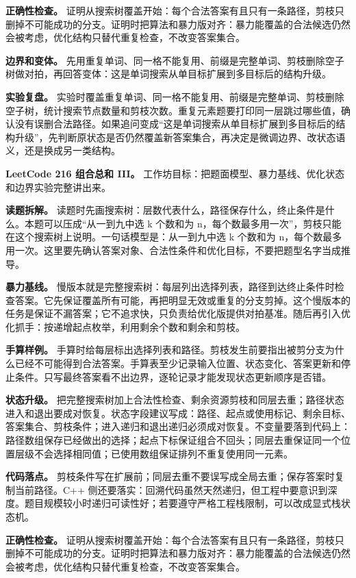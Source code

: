 \textbf{正确性检查。} 证明从搜索树覆盖开始：每个合法答案有且只有一条路径，剪枝只删掉不可能成功的分支。证明时把算法和暴力版对齐：暴力能覆盖的合法候选仍然会被考虑，优化结构只替代重复检查，不改变答案集合。

\textbf{边界和变体。} 先用重复单词、同一格不能复用、前缀是完整单词、剪枝删除空子树做对拍，再回答变体：这是单词搜索从单目标扩展到多目标后的结构升级。

\textbf{实验复盘。} 实验时覆盖重复单词、同一格不能复用、前缀是完整单词、剪枝删除空子树，统计搜索节点数量和剪枝次数。重复元素题要打印同一层跳过哪些值，确认没有误删合法路径。如果追问变成“这是单词搜索从单目标扩展到多目标后的结构升级”，先判断原状态是否仍然覆盖新答案集合，再决定是微调边界、改状态语义，还是换成另一类结构。

\noindent\textbf{LeetCode 216 组合总和 III。} 工作坊目标：把题面模型、暴力基线、优化状态和边界实验完整讲出来。

\textbf{读题拆解。} 读题时先画搜索树：层数代表什么，路径保存什么，终止条件是什么。本题可以压成“从一到九中选 k 个数和为 n，每个数最多用一次”，剪枝只能在这个搜索树上说明。一句话模型是：从一到九中选 k 个数和为 n，每个数最多用一次。这里要先确认答案对象、合法性条件和优化目标，不要把题型名字当成推导。

\textbf{暴力基线。} 慢版本就是完整搜索树：每层列出选择列表，路径到达终止条件时检查答案。它先保证覆盖所有可能，再把明显无效或重复的分支剪掉。这个慢版本的任务是保证不漏答案；它不追求快，只负责给优化版提供对拍基准。随后再引入优化抓手：按递增起点枚举，利用剩余个数和剩余和剪枝。

\textbf{手算样例。} 手算时给每层标出选择列表和路径。剪枝发生前要指出被剪分支为什么已经不可能得到合法答案。手算表至少记录输入位置、状态变化、答案更新和停止条件。只写最终答案看不出边界，逐轮记录才能发现状态更新顺序是否错。

\textbf{状态升级。} 把完整搜索树加上合法性检查、剩余资源剪枝和同层去重；路径状态进入和退出要成对恢复。状态字段建议写成：路径、起点或使用标记、剩余目标、答案集合、剪枝条件；进入递归和退出递归必须成对恢复。不变量要落到代码上：路径数组保存已经做出的选择；起点下标保证组合不回头；同层去重保证同一个位置层级不会选择相同值；已使用数组保证排列不重复使用同一元素。

\textbf{代码落点。} 剪枝条件写在扩展前；同层去重不要误写成全局去重；保存答案时复制当前路径。C++ 侧还要落实：回溯代码虽然天然递归，但工程中要意识到深度。题目规模较小时递归可读性好；若要遵守严格工程栈限制，可以改成显式栈状态机。

\textbf{正确性检查。} 证明从搜索树覆盖开始：每个合法答案有且只有一条路径，剪枝只删掉不可能成功的分支。证明时把算法和暴力版对齐：暴力能覆盖的合法候选仍然会被考虑，优化结构只替代重复检查，不改变答案集合。

